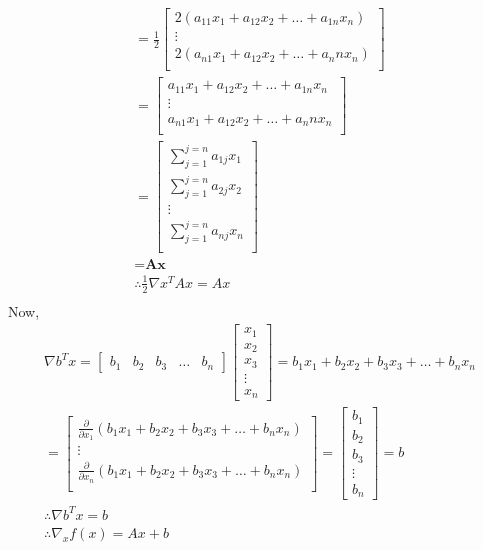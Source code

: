 \documentclass{article}
\begin{document}
\begin{gather*}
    = \frac{1}{2}\begin{bmatrix}
        2(a_{11}x_{1} + a_{12}x_{2} + \hdots + a_{1n}x_{n}) \\
        \vdots \\
        2(a_{n1}x_{1} + a_{12}x_{2} + \hdots + {a_nn}x_n) \\
    \end{bmatrix} \\
    = \begin{bmatrix}
        a_{11}x_{1} + a_{12}x_{2} + \hdots + a_{1n}x_{n} \\
        \vdots \\
        a_{n1}x_{1} + a_{12}x_{2} + \hdots + {a_nn}x_n \\
    \end{bmatrix} \\
    = \begin{bmatrix}
        \sum_{j=1}^{j=n}a_{1j}x_1 \\
        \sum_{j=1}^{j=n}a_{2j}x_2 \\
        \vdots \\
        \sum_{j=1}^{j=n}a_{nj}x_n \\
    \end{bmatrix} \\
    = \textbf{Ax} \\
    \therefore \frac{1}{2} \nabla x^TAx = Ax \\
\end{gather*}
Now, \begin{gather*}
    \nabla b^Tx = \begin{bmatrix}
        b_1 & b_2 & b_3 & \hdots & b_n
    \end{bmatrix}
    \begin{bmatrix}
        x_1 \\
        x_2 \\
        x_3 \\
        \vdots \\
        x_n
    \end{bmatrix}
    = b_1x_1 + b_2x_2 + b_3x_3 + \hdots + b_nx_n \\
    = \begin{bmatrix}
        \frac{\partial}{\partial x_1}(b_1x_1 + b_2x_2 + b_3x_3 + \hdots + b_nx_n  ) \\
        \vdots \\
        \frac{\partial}{\partial x_n} (b_1x_1 + b_2x_2 + b_3x_3 + \hdots + b_nx_n ) \\
    \end{bmatrix}
    = \begin{bmatrix}
        b_1 \\
        b_2 \\
        b_3 \\
        \vdots \\
        b_n
    \end{bmatrix} = b \\
    \therefore \nabla b^Tx = b \\
    \therefore \nabla_x f(x) = Ax + b \\
\end{gather*}
\end{document}
